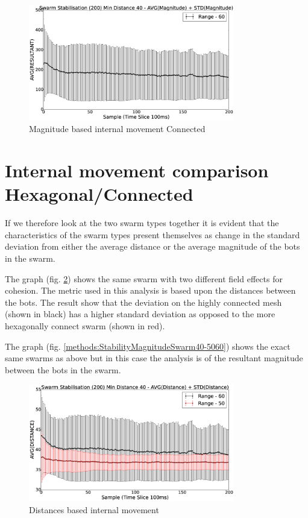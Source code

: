 \documentclass[10pt,journal,letterpaper,twoside]{IEEEtran}
\newcommand{\swarmA}{Hexagonal}
\newcommand{\swarmB}{Connected}
\newcommand{\stability}{internal movement}
\newcommand{\Stability}{Internal movement}
\newcommand{\Fig}{fig.}
\begin{document}
\begin{figure}[H]
\begin{center}
\includegraphics[width=9cm]{figures/StabilityMagnitudeSwarm40-60}
\end{center}
\caption{Magnitude based \stability{} \swarmB{}\label{methods:StabilityMagnitudeSwarm40-60}}
\end{figure}

\section{\Stability{} comparison \swarmA{}/\swarmB{}\label{section:stabilityComparison}}

If we therefore look at the two swarm types together it is evident that the characteristics of the swarm types present themselves as change in the standard deviation from either the average distance or the average magnitude of the bots in the swarm.

The graph (\Fig{} \ref{methods:StabilityDistanceSwarm40-5060}) shows the same swarm with two different field effects for cohesion. The metric used in this analysis is based upon the distances between the bots. The result show that the deviation on the highly connected mesh (shown in black) has a higher standard deviation as opposed to the more hexagonally connect swarm (shown in red).

The graph (\Fig{} \ref{methods:StabilityMagnitudeSwarm40-5060}) shows the exact same swarms as above but in this case the analysis is of the resultant magnitude between the bots in the swarm.

\begin{figure}[H]
\begin{center}
\includegraphics[width=9cm]{figures/StabilityDistanceSwarm40-5060}
\end{center}
\caption{Distances based \stability{}\label{methods:StabilityDistanceSwarm40-5060}}
\end{figure}
\end{document}
